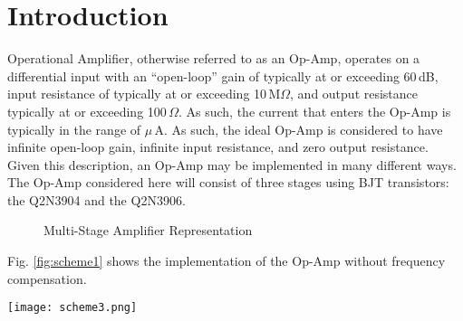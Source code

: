 \documentclass[lettersize,journal]{IEEEtran}
\begin{document}
\section{Introduction}
 Operational Amplifier, otherwise referred to as 
an Op-Amp, operates on a differential input with an ``open-loop'' gain of 
typically at or exceeding 60$\,$dB, input resistance of typically at or exceeding 10$\,$M$\Omega$, 
and output resistance typically at or exceeding 100$\,\Omega$. As such, the 
current that enters the Op-Amp is typically in the range of $\mu\,$A.
As such, the ideal Op-Amp is considered to have infinite open-loop gain, 
infinite input resistance, and zero output resistance. Given this description, 
an Op-Amp may be implemented in many different ways. The Op-Amp considered 
here will consist of three stages using BJT transistors: the Q2N3904 and 
the Q2N3906.
\begin{figure}[H]
  \centering
  \caption{Multi-Stage Amplifier Representation}
\end{figure}

Fig. \ref{fig:scheme1} shows the implementation of the Op-Amp without 
frequency compensation.
\begin{figure*}[t]
  \centering
  \texttt{[image: scheme3.png]}
  \caption{Op-Amp Schematic Without Frequency Compensation}
  \label{fig:scheme1}
\end{figure*}
\end{document}
